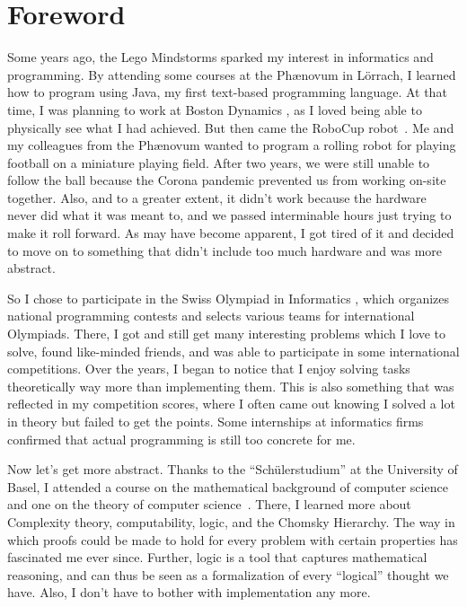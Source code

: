 \chapter*{Foreword}

Some years ago, the Lego Mindstorms \cite{lego} sparked my interest in informatics and programming.
By attending some courses at the Phænovum \cite{phaenovum} in Lörrach, I learned how to program using Java, my first text-based programming language.
At that time, I was planning to work at Boston Dynamics \cite{boston}, as I loved being able to physically see what I had achieved.
But then came the RoboCup robot~\cite{roboCup}.
Me and my colleagues from the Phænovum wanted to program a rolling robot for playing football on a miniature playing field.
After two years, we were still unable to follow the ball because the Corona pandemic prevented us from working on-site together.
Also, and to a greater extent, it didn't work because the hardware never did what it was meant to, and we passed interminable hours just trying to make it roll forward.
As may have become apparent, I got tired of it and decided to move on to something that didn't include too much hardware and was more abstract.

So I chose to participate in the Swiss Olympiad in Informatics \cite{soi}, which organizes national programming contests and selects various teams for international Olympiads.
There, I got and still get many interesting problems which I love to solve, found like-minded friends, and was able to participate in some international competitions. %
Over the years, I began to notice that I enjoy solving tasks theoretically way more than implementing them.
This is also something that was reflected in my competition scores, where I often came out knowing I solved a lot in theory but failed to get the points.
Some internships at informatics firms confirmed that actual programming is still too concrete for me. %

Now let's get more abstract.
Thanks to the ``Schülerstudium'' at the University of Basel, I attended a course on the mathematical background of computer science~\cite{discrete-maths} and one on the theory of computer science~\cite{theory-cs}.
There, I learned more about Complexity theory, computability, logic, and the Chomsky Hierarchy.
The way in which proofs could be made to hold for every problem with certain properties has fascinated me ever since.
Further, logic is a tool that captures mathematical reasoning, and can thus be seen as a formalization of every ``logical'' thought we have.
Also, I don't have to bother with implementation any more.

